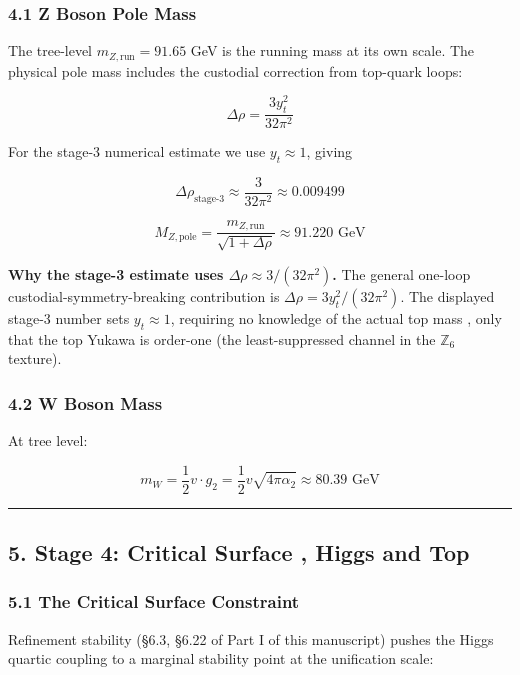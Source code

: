 \subsubsection{4.1 Z Boson Pole Mass}\label{41-z-boson-pole-mass}

The tree-level \(m_{Z,\text{run}} = 91.65\) GeV is the running mass at its own scale. The physical pole mass includes the custodial correction from top-quark loops:

\[\Delta\rho = \frac{3y_t^2}{32\pi^2}\]

For the stage-3 numerical estimate we use \(y_t \approx 1\), giving

\[\Delta\rho_{\text{stage-3}} \approx \frac{3}{32\pi^2} \approx 0.009499\]

\[M_{Z,\text{pole}} = \frac{m_{Z,\text{run}}}{\sqrt{1 + \Delta\rho}} \approx 91.220 \text{ GeV}\]

\textbf{Why the stage-3 estimate uses \(\Delta\rho \approx 3/(32\pi^2)\).} The general one-loop custodial-symmetry-breaking contribution is \(\Delta\rho = 3y_t^2/(32\pi^2)\). The displayed stage-3 number sets \(y_t \approx 1\), requiring no knowledge of the actual top mass , only that the top Yukawa is order-one (the least-suppressed channel in the \(\mathbb{Z}_6\) texture).

\subsubsection{4.2 W Boson Mass}\label{42-w-boson-mass}

At tree level:

\[m_W = \frac{1}{2} v \cdot g_2 = \frac{1}{2} v \sqrt{4\pi\alpha_2} \approx 80.39 \text{ GeV}\]

\begin{center}\rule{0.5\linewidth}{0.5pt}\end{center}

\subsection{5. Stage 4: Critical Surface , Higgs and Top}\label{5-stage-4-critical-surface--higgs-and-top}

\subsubsection{5.1 The Critical Surface Constraint}\label{51-the-critical-surface-constraint}

Refinement stability (§6.3, §6.22 of Part I of this manuscript) pushes the Higgs quartic coupling to a marginal stability point at the unification scale:

